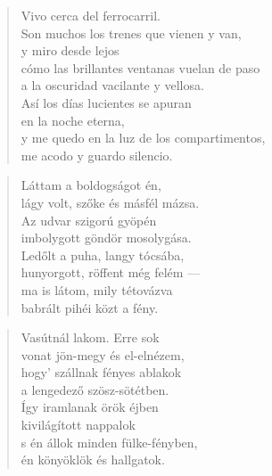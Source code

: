 \bigskip



\begin{verse}
  Vivo cerca del ferrocarril. \\
  Son muchos los trenes que vienen y van, \\
  y miro desde lejos \\
  cómo las brillantes ventanas vuelan de paso \\
  a la oscuridad vacilante y vellosa. \\
  Así los días lucientes se apuran \\
  en la noche eterna, \\
  y me quedo en la luz de los compartimentos, \\
  me acodo y guardo silencio.
\end{verse}

\newpage

\vspace*{-15mm}
\centeredornament



\begin{verse}
  Láttam a boldogságot én, \\
  lágy volt, szőke és másfél mázsa. \\
  Az udvar szigorú gyöpén \\
  imbolygott göndör mosolygása. \\
  Ledőlt a puha, langy tócsába, \\
  hunyorgott, röffent még felém --- \\
  ma is látom, mily tétovázva \\
  babrált pihéi közt a fény.
\end{verse}

\bigskip


\begin{verse}
  Vasútnál lakom. Erre sok \\
  vonat jön-megy és el-elnézem, \\
  hogy' szállnak fényes ablakok \\
  a lengedező szösz-sötétben. \\
  Így iramlanak örök éjben \\
  kivilágított nappalok \\
  s én állok minden fülke-fényben, \\
  én könyöklök és hallgatok.
\end{verse}
